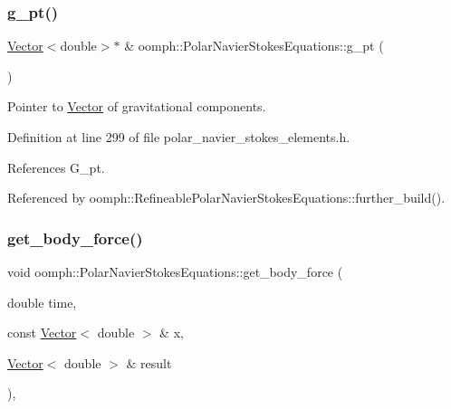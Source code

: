 \subsubsection{\texorpdfstring{g\+\_\+pt()}{g\_pt()}}
{\footnotesize\ttfamily \hyperlink{classoomph_1_1Vector}{Vector}$<$double$>$$\ast$ \& oomph\+::\+Polar\+Navier\+Stokes\+Equations\+::g\+\_\+pt (\begin{DoxyParamCaption}{ }\end{DoxyParamCaption})\hspace{0.3cm}{\ttfamily [inline]}}



Pointer to \hyperlink{classoomph_1_1Vector}{Vector} of gravitational components. 



Definition at line 299 of file polar\+\_\+navier\+\_\+stokes\+\_\+elements.\+h.



References G\+\_\+pt.



Referenced by oomph\+::\+Refineable\+Polar\+Navier\+Stokes\+Equations\+::further\+\_\+build().

\mbox{\label{classoomph_1_1PolarNavierStokesEquations_a7b8e7dac6fe147c271230d34ef5cf450}} 
\subsubsection{\texorpdfstring{get\+\_\+body\+\_\+force()}{get\_body\_force()}}
{\footnotesize\ttfamily void oomph\+::\+Polar\+Navier\+Stokes\+Equations\+::get\+\_\+body\+\_\+force (\begin{DoxyParamCaption}\item[{double}]{time,  }\item[{const \hyperlink{classoomph_1_1Vector}{Vector}$<$ double $>$ \&}]{x,  }\item[{\hyperlink{classoomph_1_1Vector}{Vector}$<$ double $>$ \&}]{result }\end{DoxyParamCaption})\hspace{0.3cm}{\ttfamily [inline]}, {\ttfamily [protected]}}



